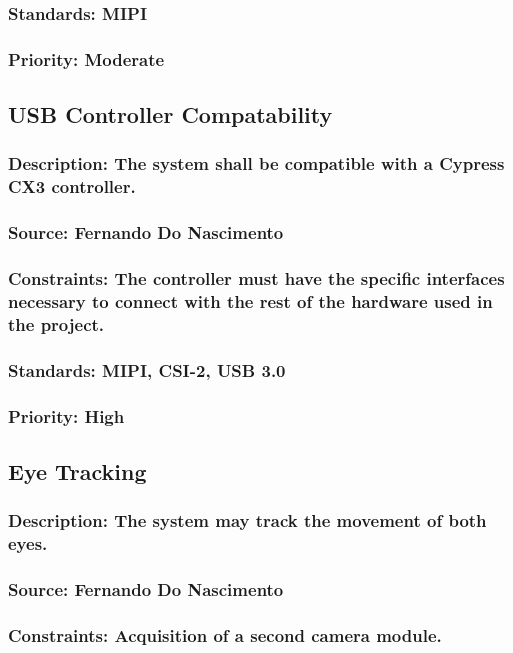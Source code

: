 \subsubsection{Standards: MIPI}
\subsubsection{Priority: Moderate}

\subsection{USB Controller Compatability}
\subsubsection{Description: The system shall be compatible with a Cypress CX3 controller.}
\subsubsection{Source: Fernando Do Nascimento}
\subsubsection{Constraints: The controller must have the specific interfaces necessary to connect with the rest of the hardware used in the project.}
\subsubsection{Standards: MIPI, CSI-2, USB 3.0}
\subsubsection{Priority: High}

\subsection{Eye Tracking}
\subsubsection{Description: The system may track the movement of both eyes.}
\subsubsection{Source: Fernando Do Nascimento}
\subsubsection{Constraints: Acquisition of a second camera module.}

